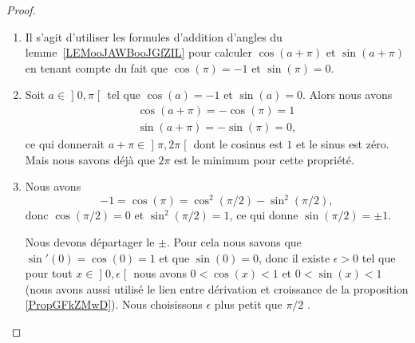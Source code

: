 \begin{proof}
\begin{enumerate}
		      Mais d'un autre côté, le nombre \( 2\pi\) est le plus petit \( T\) vérifiant \( \cos(T)=1\), \( \sin(T)=0\). Donc, avoir \( \cos(\pi)=1\) n'est pas possible. Nous concluons
		      \begin{subequations}
			      \begin{numcases}{}
				      \cos(\pi)=-1\\
				      \sin(\pi)=0.
			      \end{numcases}
		      \end{subequations}
		\item
		      Il s'agit d'utiliser les formules d'addition d'angles du lemme~\ref{LEMooJAWBooJGfZIL} pour calculer \( \cos(a+\pi)\) et \( \sin(a+\pi)\) en tenant compte du fait que \( \cos(\pi)=-1\) et \( \sin(\pi)=0\).
		\item
		      Soit \( a\in\mathopen] 0 , \pi \mathclose[\) tel que \( \cos(a)=-1\) et \( \sin(a)=0\). Alors nous avons
			      \begin{subequations}
				      \begin{align}
					      \cos(a+\pi)=-\cos(\pi)=1 \\
					      \sin(a+\pi)=-\sin(\pi)=0,
				      \end{align}
			      \end{subequations}
			      ce qui donnerait \( a+\pi\in\mathopen] \pi , 2\pi \mathclose[\) dont le cosinus est \( 1\) et le sinus est zéro. Mais nous savons déjà que \( 2\pi\) est le minimum pour cette propriété.
		\item
		      Nous avons
		      \begin{equation}
			      -1=\cos(\pi)=\cos^2(\pi/2)-\sin^2(\pi/2),
		      \end{equation}
		      donc \( \cos(\pi/2)=0\) et \( \sin^2(\pi/2)=1\), ce qui donne \( \sin(\pi/2)=\pm 1\).

          Nous devons départager le \( \pm\). Pour cela nous savons que \( \sin'(0)=\cos(0)=1\) et que \( \sin(0)=0\), donc il existe \( \epsilon>0\) tel que pour tout \( x\in\mathopen] 0 , \epsilon \mathclose[\) nous avons \( 0<\cos(x)<1\) et \( 0<\sin(x)<1\) (nous avons aussi utilisé le lien entre dérivation et croissance de la proposition \ref{PropGFkZMwD}). Nous choisissons \( \epsilon\) plus petit que \( \pi/2\) .


\end{enumerate}
\end{proof}
